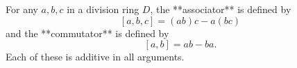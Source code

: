 For any $a, b, c$ in a division ring $D$, the **associator** is defined by
$$[a, b, c] = (ab)c - a(bc)$$
and the **commutator** is defined by
$$[a, b] = ab - ba.$$
Each of these is additive in all arguments.